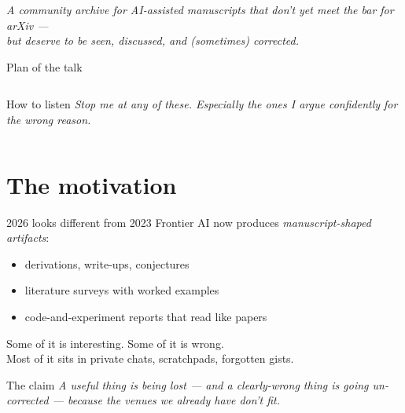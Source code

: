 \documentclass[10pt,aspectratio=43]{beamer}
\title[\PreXivPlain]{\PreXiv}
\subtitle{a preprint repository for AI-assisted research}
\author{An open-source side project}
\institute{\small\texttt{github.com/PrinciplePhysics/pre-arxiv}}
\date{2026}
\newenvironment{idea}[1][Idea]{\begin{block}{#1}\itshape}{\end{block}}
\begin{document}
\begin{frame}
  \titlepage
  \vspace{-0.6em}
  \begin{center}
    \footnotesize\itshape\color{prexivmuted}
    A community archive for AI-assisted manuscripts that don't yet meet the bar for arXiv ---\\
    but deserve to be seen, discussed, and (sometimes) corrected.
  \end{center}
\end{frame}

\begin{frame}{Plan of the talk}
  \begin{columns}[T,onlytextwidth]
      \tableofcontents[hideallsubsections]
      \footnotesize
      \begin{idea}[How to listen]
        Stop me at any of these. Especially the ones I argue confidently for the wrong reason.
      \end{idea}
  \end{columns}
\end{frame}

\section{The motivation}

\begin{frame}{2026 looks different from 2023}
  Frontier AI now produces \emph{manuscript-shaped artifacts}:
  \begin{itemize}
    \item derivations, write-ups, conjectures
    \item literature surveys with worked examples
    \item code-and-experiment reports that read like papers
  \end{itemize}

  \medskip
  Some of it is interesting. Some of it is wrong. \\
  Most of it sits in private chats, scratchpads, forgotten gists.

  \medskip\pause
  \begin{idea}[The claim]
    A useful thing is being lost --- and a clearly-wrong thing is going un-corrected --- because the venues we already have don't fit.
  \end{idea}
\end{frame}
\end{document}
